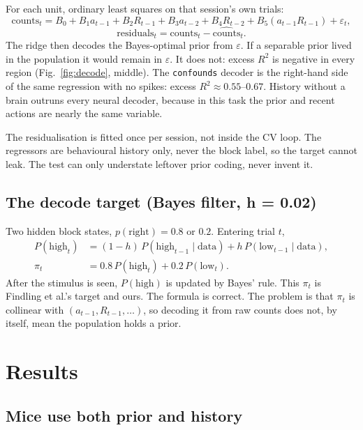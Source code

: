 \documentclass[11pt,a4paper]{article}
\begin{document}
For each unit, ordinary least squares on that session's own trials:
\begin{equation}
\mathrm{counts}_t
=
B_0
+ B_1 a_{t-1}
+ B_2 R_{t-1}
+ B_3 a_{t-2}
+ B_4 R_{t-2}
+ B_5(a_{t-1}R_{t-1})
+ \varepsilon_t,
\end{equation}
\begin{equation}
\mathrm{residuals}_t
=
\mathrm{counts}_t-\widehat{\mathrm{counts}}_t.
\end{equation}
The ridge then decodes the Bayes-optimal prior from \(\varepsilon\). If a
separable prior lived in the population it would remain in \(\varepsilon\).
It does not: excess \(R^2\) is negative in every region
(Fig.~\ref{fig:decode}, middle). The \texttt{confounds} decoder is the
right-hand side of the same regression with no spikes: excess
\(R^2\approx 0.55\)--\(0.67\). History without a brain outruns every neural
decoder, because in this task the prior and recent actions are nearly the
same variable.

The residualisation is fitted once per session, not inside the CV loop. The
regressors are behavioural history only, never the block label, so the
target cannot leak. The test can only understate leftover prior coding, never
invent it.

\subsection{The decode target (Bayes filter, h = 0.02)}

Two hidden block states, \(p(\mathrm{right})=0.8\) or \(0.2\). Entering trial
\(t\),
\begin{align}
P(\mathrm{high}_t)
&=
(1-h)\,P(\mathrm{high}_{t-1}\mid\mathrm{data})
+
h\,P(\mathrm{low}_{t-1}\mid\mathrm{data}),
\\
\pi_t
&=
0.8\,P(\mathrm{high}_t)
+
0.2\,P(\mathrm{low}_t).
\end{align}
After the stimulus is seen, \(P(\mathrm{high})\) is updated by Bayes' rule.
This \(\pi_t\) is Findling et al.'s target and ours. The formula is correct.
The problem is that \(\pi_t\) is collinear with \((a_{t-1},R_{t-1},\ldots)\),
so decoding it from raw counts does not, by itself, mean the population holds
a prior.

\section{Results}

\subsection{Mice use both prior and history}
\end{document}
